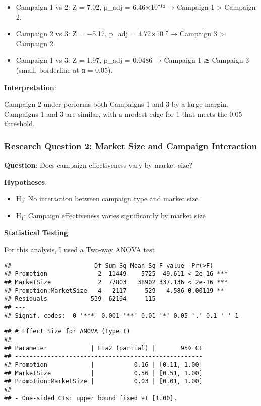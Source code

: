 \documentclass[
]{article}
\providecommand{\tightlist}{%
  \setlength{\itemsep}{0pt}\setlength{\parskip}{0pt}}
\begin{document}
\begin{itemize}
\tightlist
\item
  Campaign 1 vs 2: Z = 7.02, p\_adj = 6.46×10⁻¹² → Campaign 1
  \textgreater{} Campaign 2.
\item
  Campaign 2 vs 3: Z = −5.17, p\_adj = 4.72×10⁻⁷ → Campaign 3
  \textgreater{} Campaign 2.
\item
  Campaign 1 vs 3: Z = 1.97, p\_adj = 0.0486 → Campaign 1 ≳ Campaign 3
  (small, borderline at α = 0.05).
\end{itemize}

\textbf{Interpretation}:

Campaign 2 under-performs both Campaigns 1 and 3 by a large margin.
Campaigns 1 and 3 are similar, with a modest edge for 1 that meets the
0.05 threshold.

\subsubsection{Research Question 2: Market Size and Campaign
Interaction}\label{research-question-2-market-size-and-campaign-interaction}

\textbf{Question}: Does campaign effectiveness vary by market size?

\textbf{Hypotheses}:

\begin{itemize}
\tightlist
\item
  H₀: No interaction between campaign type and market size
\item
  H₁: Campaign effectiveness varies significantly by market size
\end{itemize}

\textbf{Statistical Testing}

For this analysis, I used a Two-way ANOVA test

\begin{verbatim}
##                       Df Sum Sq Mean Sq F value  Pr(>F)    
## Promotion              2  11449    5725  49.611 < 2e-16 ***
## MarketSize             2  77803   38902 337.136 < 2e-16 ***
## Promotion:MarketSize   4   2117     529   4.586 0.00119 ** 
## Residuals            539  62194     115                    
## ---
## Signif. codes:  0 '***' 0.001 '**' 0.01 '*' 0.05 '.' 0.1 ' ' 1
\end{verbatim}

\begin{verbatim}
## # Effect Size for ANOVA (Type I)
## 
## Parameter            | Eta2 (partial) |       95% CI
## ----------------------------------------------------
## Promotion            |           0.16 | [0.11, 1.00]
## MarketSize           |           0.56 | [0.51, 1.00]
## Promotion:MarketSize |           0.03 | [0.01, 1.00]
## 
## - One-sided CIs: upper bound fixed at [1.00].
\end{verbatim}
\end{document}
